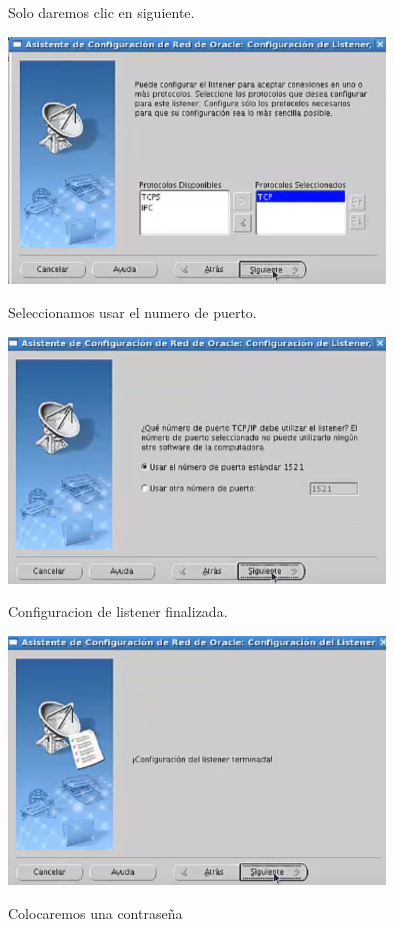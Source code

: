 \documentclass[12pt,letterpaper]{article}
\begin{document}
Solo daremos clic en siguiente. \\
\begin{center}
\includegraphics[width=10cm]{oraclelinux/37.png}
\end{center}
Seleccionamos usar el numero de puerto.
\begin{center}
\includegraphics[width=10cm]{oraclelinux/38.png}
\end{center}
Configuracion de listener finalizada.
\begin{center}
\includegraphics[width=10cm]{oraclelinux/39.png}
\end{center}
Colocaremos una contraseña \\
\end{document}
